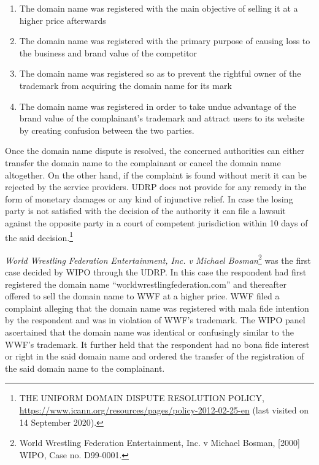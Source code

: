 \begin{multicols}{2}
\begin{enumerate}[label=$\bullet$]
\item The domain name was registered with the main objective of selling it at a higher price
afterwards

\item The domain name was registered with the primary purpose of causing loss to the
business and brand value of the competitor

\item The domain name was registered so as to prevent the rightful owner of the trademark
from acquiring the domain name for its mark

\item The domain name was registered in order to take undue advantage of the brand value
of the complainant’s trademark and attract users to its website by creating confusion
between the two parties. 
\end{enumerate}

\noi
Once the domain name dispute is resolved, the concerned authorities can either transfer the
domain name to the complainant or cancel the domain name altogether. On the other hand, if
the complaint is found without merit it can be rejected by the service providers. UDRP does
not provide for any remedy in the form of monetary damages or any kind of injunctive relief.
In case the losing party is not satisfied with the decision of the authority it can file a lawsuit
against the opposite party in a court of competent jurisdiction within 10 days of the said
decision.\footnote{THE UNIFORM DOMAIN DISPUTE RESOLUTION POLICY, \url{https://www.icann.org/resources/pages/policy-2012-02-25-en} (last visited on 14 September 2020).}

\noi
\textit{World Wrestling Federation Entertainment, Inc. v Michael Bosman}\footnote{World Wrestling Federation Entertainment, Inc. v Michael Bosman, [2000] WIPO, Case no. D99-0001.} was the first case
decided by WIPO through the UDRP. In this case the respondent had first registered the
domain name “worldwrestlingfederation.com” and thereafter offered to sell the domain name
to WWF at a higher price. WWF filed a complaint alleging that the domain name was
registered with mala fide intention by the respondent and was in violation of WWF’s
trademark. The WIPO panel ascertained that the domain name was identical or confusingly
similar to the WWF’s trademark. It further held that the respondent had no bona fide interest
or right in the said domain name and ordered the transfer of the registration of the said
domain name to the complainant.


\end{multicols}
